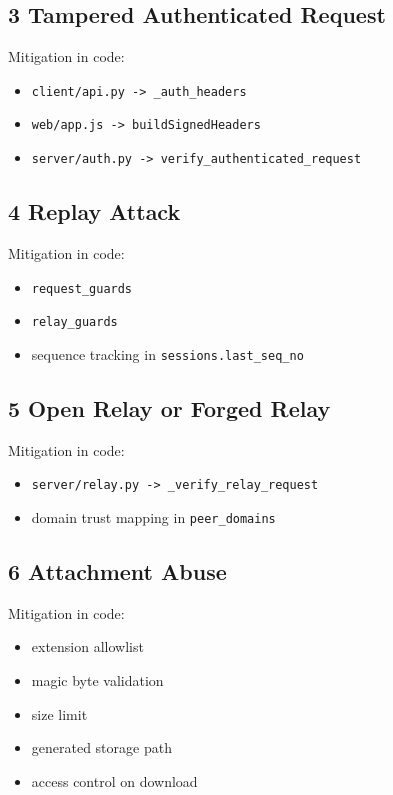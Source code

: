 \documentclass[11pt,a4paper]{article}
\begin{document}
\subsection{3 Tampered Authenticated Request}

Mitigation in code:

\begin{itemize}
\item \nolinkurl{client/api.py -> _auth_headers}
\item \nolinkurl{web/app.js -> buildSignedHeaders}
\item \nolinkurl{server/auth.py -> verify_authenticated_request}
\end{itemize}

\subsection{4 Replay Attack}

Mitigation in code:

\begin{itemize}
\item \nolinkurl{request_guards}
\item \nolinkurl{relay_guards}
\item sequence tracking in \nolinkurl{sessions.last_seq_no}
\end{itemize}

\subsection{5 Open Relay or Forged Relay}

Mitigation in code:

\begin{itemize}
\item \nolinkurl{server/relay.py -> _verify_relay_request}
\item domain trust mapping in \nolinkurl{peer_domains}
\end{itemize}

\subsection{6 Attachment Abuse}

Mitigation in code:

\begin{itemize}
\item extension allowlist
\item magic byte validation
\item size limit
\item generated storage path
\item access control on download
\end{itemize}
\end{document}
